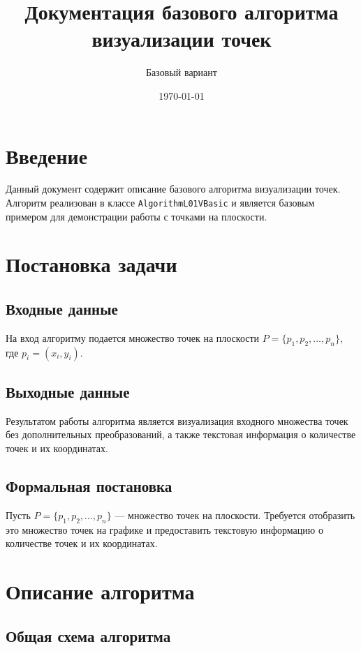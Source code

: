 \documentclass[a4paper,12pt]{article}
\title{Документация базового алгоритма визуализации точек}
\author{Базовый вариант}
\date{\today}
\begin{document}
\maketitle

\tableofcontents

\newpage

\section{Введение}

Данный документ содержит описание базового алгоритма визуализации точек. Алгоритм реализован в классе \texttt{AlgorithmL01VBasic} и является базовым примером для демонстрации работы с точками на плоскости.

\section{Постановка задачи}

\subsection{Входные данные}
На вход алгоритму подается множество точек на плоскости $P = \{p_1, p_2, \ldots, p_n\}$, где $p_i = (x_i, y_i)$.

\subsection{Выходные данные}
Результатом работы алгоритма является визуализация входного множества точек без дополнительных преобразований, а также текстовая информация о количестве точек и их координатах.

\subsection{Формальная постановка}
Пусть $P = \{p_1, p_2, \ldots, p_n\}$ — множество точек на плоскости. Требуется отобразить это множество точек на графике и предоставить текстовую информацию о количестве точек и их координатах.

\section{Описание алгоритма}

\subsection{Общая схема алгоритма}
\end{document}
